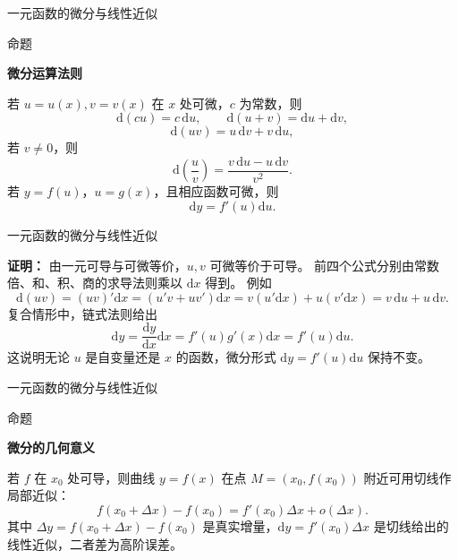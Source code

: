 \documentclass[aspectratio=169,10pt,fontset=fandol]{ctexbeamer}
\newcommand{\dd}{\mathrm{d}}
\begin{document}
\begin{frame}[t,fragile]{一元函数的微分与线性近似}
\small
\begin{block}{命题}
{\small
\textbf{微分运算法则}\par

若 $u=u(x),v=v(x)$ 在 $x$ 处可微，$c$ 为常数，则
\[
\dd(cu)=c\,\dd u,\qquad \dd(u+v)=\dd u+\dd v,
\]
\[
\dd(uv)=u\,\dd v+v\,\dd u,
\]
若 $v\neq0$，则
\[
\dd\left(\frac{u}{v}\right)=\frac{v\,\dd u-u\,\dd v}{v^2}.
\]
若 $y=f(u)$，$u=g(x)$，且相应函数可微，则
\[
\dd y=f'(u)\dd u.
\]

}
\end{block}
\end{frame}
\begin{frame}[t,fragile]{一元函数的微分与线性近似}
\normalsize
{\normalsize
\textbf{证明：}
由一元可导与可微等价，$u,v$ 可微等价于可导。 前四个公式分别由常数倍、和、积、商的求导法则乘以 $\dd x$ 得到。 例如
\[
\dd(uv)=(uv)'\dd x=(u'v+uv')\dd x=v(u'\dd x)+u(v'\dd x)=v\,\dd u+u\,\dd v.
\]
复合情形中，链式法则给出
\[
\dd y=\frac{\dd y}{\dd x}\dd x=f'(u)g'(x)\dd x=f'(u)\dd u.
\]
这说明无论 $u$ 是自变量还是 $x$ 的函数，微分形式 $\dd y=f'(u)\dd u$ 保持不变。

}
\end{frame}
\begin{frame}[t,fragile]{一元函数的微分与线性近似}
\normalsize
\begin{block}{命题}
{\normalsize
\textbf{微分的几何意义}\par

若 $f$ 在 $x_0$ 处可导，则曲线 $y=f(x)$ 在点 $M=(x_0,f(x_0))$ 附近可用切线作局部近似：
\[
f(x_0+\Delta x)-f(x_0)=f'(x_0)\Delta x+o(\Delta x).
\]
其中 $\Delta y=f(x_0+\Delta x)-f(x_0)$ 是真实增量，$\dd y=f'(x_0)\Delta x$ 是切线给出的线性近似，二者差为高阶误差。

}
\end{block}
\end{frame}
\end{document}
